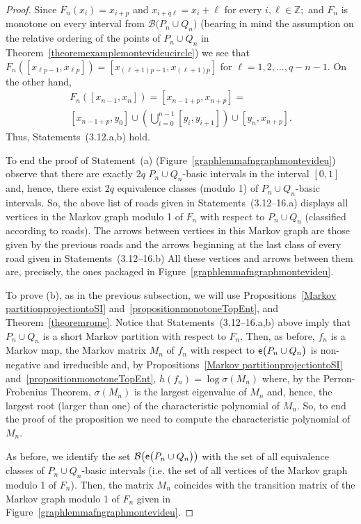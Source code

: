 \documentclass[a4paper, 11pt]{amsart}
\numberwithin{equation}{section}
\theoremstyle{customnumberedtheorem}
\theoremstyle{definitionwithbfnote}
\newcommand{\Z}{\ensuremath{\mathbb{Z}}}
\DeclareMathOperator{\eexp}{\textsf{\upshape e}}
\newcommand{\bigemap}[1]{\ensuremath{\eexp\bigl(#1\bigr)}}
\def\calB{\mathcal{B}}
\newcommand{\bigSBI}[1]{\ensuremath{\calB\bigl(#1\bigr)}}
\begin{document}
\begin{proof}
Since $F_n(x_i) = x_{i+p}$ and $x_{i + q\ell} = x_i + \ell$
for every $i,\ell \in \Z;$
and $F_n$ is monotone on every interval from $\bigSBI{P_n \cup Q_n}$
(bearing in mind the assumption on the relative ordering of the
points of $P_n \cup Q_n$ in
Theorem~\ref{theoremexamplemontevideucircle}) we see that
$
  F_n\left(\left[x_{\ell p-1},x_{\ell p}\right]\right) =
  \left[x_{(\ell+1) p-1},x_{(\ell+1) p}\right]
$ for $\ell = 1,2,\dots,q-n-1.$
On the other hand,
\begin{multline*}
  F_n\left(\left[x_{n-1},x_{n}\right]\right) =
  \left[x_{n-1+p},x_{n+p}\right] = \\
  \left[x_{n-1+p},y_0\right] \cup
     \left(\bigcup_{i=0}^{n-1} \left[y_i,y_{i+1}\right]\right) \cup
  \left[y_n,x_{n+p}\right].
\end{multline*}
Thus, Statements~(3.12.a,b) hold.

To end the proof of Statement~(a)
(Figure~\ref{graphlemmafngraphmontevideu})
observe that there are exactly
$2q$ $P_n \cup Q_n$-basic intervals in the interval $[0,1]$ and,
hence, there exist $2q$ equivalence classes (modulo 1) of
$P_n \cup Q_n$-basic intervals.
So, the above list of roads given in Statements~(3.12--16.a)
displays all vertices in the Markov graph modulo 1 of $F_n$
with respect to $P_n \cup Q_n$ (classified according to roads).
The arrows between vertices in this Markov graph are those given
by the previous roads and the arrows beginning at the last class
of every road given in Statements~(3.12--16.b)
All these vertices and arrows between them are, precisely,
the ones packaged in Figure~\ref{graphlemmafngraphmontevideu}.

To prove (b), as in the previous subsection, we will use
Propositions~\ref{Markov partitionprojectiontoSI}
and~\ref{propositionmonotoneTopEnt},
and Theorem~\ref{theoremrome}.
Notice that Statements~(3.12--16.a,b) above imply that
$P_n \cup Q_n$ is a short Markov partition with respect to $F_n.$
Then, as before, $f_n$ is a Markov map,
the Markov matrix $M_n$ of $f_n$ with respect to
$\bigemap{P_n \cup Q_n}$ is non-negative and irreducible
and, by Propositions~\ref{Markov partitionprojectiontoSI}
and~\ref{propositionmonotoneTopEnt},
$
    h(f_n) = \log \sigma(M_n)
$
where, by the Perron-Frobenius Theorem,
$\sigma(M_n)$ is the largest eigenvalue of $M_n$ and, hence,
the largest root (larger than one) of
the characteristic polynomial of $M_n$.
So, to end the proof of the proposition we need to compute
the characteristic polynomial of $M_n$.

As before, we identify the set $\bigSBI{\bigemap{P_n \cup Q_n}}$
with the set of all equivalence classes of $P_n \cup Q_n$-basic intervals
(i.e. the set of all vertices of the Markov graph modulo 1 of $F_n$).
Then, the matrix $M_n$ coincides with the
transition matrix of the Markov graph modulo 1 of $F_n$
given in Figure~\ref{graphlemmafngraphmontevideu}.


\end{proof}
\end{document}
